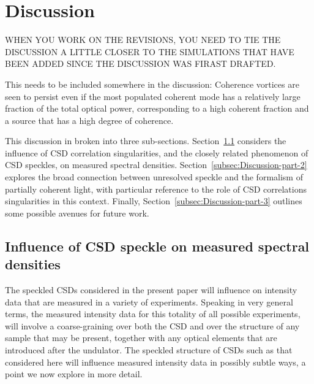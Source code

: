 \documentclass{iucr}              %
\begin{document}
\section{Discussion}

WHEN YOU WORK ON THE REVISIONS, YOU NEED TO TIE THE DISCUSSION A  LITTLE CLOSER TO THE SIMULATIONS THAT HAVE BEEN ADDED SINCE THE DISCUSSION WAS FIRAST DRAFTED.

{\color{red} This needs to be included somewhere in the discussion: Coherence vortices are seen to persist even if the most populated coherent mode has a relatively large fraction of the total optical power, corresponding to a high coherent fraction and a source that has a high degree of coherence.}

This discussion in broken into three sub-sections.  Section~\ref{subsec:Discussion-part-1} considers the influence of CSD correlation singularities, and the closely related phenomenon of CSD speckles, on measured spectral densities.  Section~\ref{subsec:Discussion-part-2} explores the broad connection between unresolved speckle and the formalism of partially coherent light, with particular reference to the role of CSD correlations singularities in this context.  Finally, Section~\ref{subsec:Discussion-part-3} outlines some possible avenues for future work.  

\subsection{Influence of CSD speckle on measured spectral densities}\label{subsec:Discussion-part-1}

The speckled CSDs considered in the present paper will influence on intensity data that are measured in a variety of experiments.  Speaking in very general terms, the measured intensity data for this totality of all possible experiments, will involve a coarse-graining over both the CSD and over the structure of any sample that may be present, together with any optical elements that are introduced after the undulator.  The speckled structure of CSDs such as that considered here will influence measured intensity data in possibly subtle ways, a point we now explore in more detail.  
\end{document}
